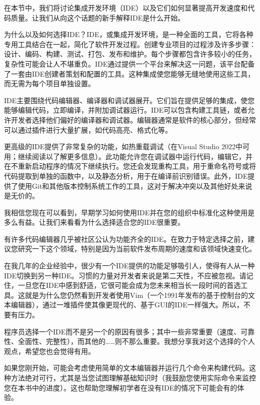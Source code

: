 在本节中，我们将讨论集成开发环境（IDE）以及它们如何显著提高开发速度和代码质量。让我们从向这个话题的新手解释IDE是什么开始。

为什么以及如何选择IDE？IDE，或集成开发环境，是一种全面的工具，它将各种专用工具结合在一起，简化了软件开发过程。创建专业项目的过程涉及许多步骤：设计、编码、构建、测试、打包、发布和维护。每个步骤都包含许多较小的任务，复杂性可能会让人不堪重负。IDE通过提供一个平台来解决这一问题，该平台配备了一套由IDE创建者策划和配置的工具。这种集成使您能够无缝地使用这些工具，而无需为每个项目单独设置。

IDE主要围绕代码编辑器、编译器和调试器展开。它们旨在提供足够的集成，使您能够编辑代码，立即编译，并附加调试器运行。IDE可以包含构建工具链，或者允许开发者选择他们偏好的编译器和调试器。编辑器通常是软件的核心部分，但经常可以通过插件进行大量扩展，如代码高亮、格式化等。

更高级的IDE提供了非常复杂的功能，如热重载调试（在Visual Studio 2022中可用；继续阅读以了解更多信息）。此功能允许您在调试器中运行代码，编辑它，并在不重新启动程序的情况下继续执行。您还会发现重构工具，用于重命名符号或将代码提取到单独的函数中，以及静态分析，用于在编译前识别错误。此外，IDE提供了使用Git和其他版本控制系统工作的工具，这对于解决冲突以及其他好处来说是无价的。

我相信您现在可以看到，早期学习如何使用IDE并在您的组织中标准化这种使用是多么有益。让我们来看看为什么选择适合您的IDE很重要。


有许多代码编辑器几乎被社区公认为功能齐全的IDE。在致力于特定选择之前，建议您研究一下这个领域，特别是因为当前软件发布周期的速度和该领域快速变化。

在我几年的企业经验中，很少有一个IDE提供的功能足够吸引人，使得有人从一种IDE切换到另一种IDE。习惯的力量对开发者来说是第二天性，不应被忽视。请记住，一旦您在IDE中感到舒适，它很可能会成为您未来相当长一段时间的首选工具。这就是为什么您仍然看到开发者使用Vim（一个1991年发布的基于控制台的文本编辑器），通过一堆插件使其像更现代的、基于GUI的IDE一样强大。所以，不要有压力。

程序员选择一个IDE而不是另一个的原因有很多；其中一些非常重要（速度、可靠性、全面性、完整性），而其他的……则不那么重要。我想分享我对这个选择的个人观点，希望您也会觉得有用。


如果您刚开始，可能会考虑使用简单的文本编辑器并运行几个命令来构建代码。这种方法绝对可行，尤其是当您试图理解基础知识时（我鼓励您使用实际命令来监控您在本书中的进度）。这也帮助您理解初学者在没有IDE的情况下可能会有的体验。

